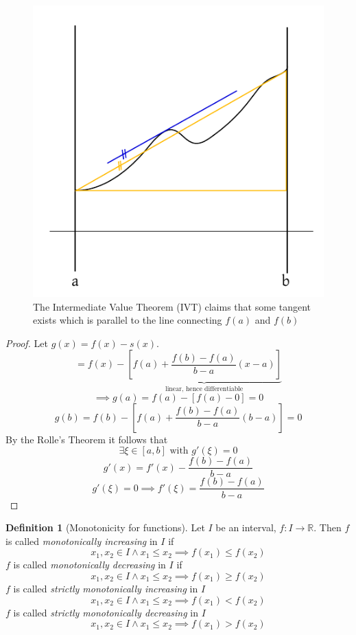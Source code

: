 \documentclass[a4paper,landscape,twocolumn]{article}
\theoremstyle{definition}
\newtheorem{defi}{Definition}
\begin{document}
\begin{figure}[!h]
  \begin{center}
    \includegraphics{img/intermediate_value_theorem.pdf}
    \caption{The Intermediate Value Theorem (IVT) claims that some tangent exists which is parallel to the line connecting $f(a)$ and $f(b)$}
  \end{center}
\end{figure}
%
\begin{proof}
  Let $g(x) = f(x) - s(x)$.
  \[ = f(x) - \underbrace{\left[f(a) + \frac{f(b) - f(a)}{b - a} (x - a)\right]}_{\text{linear, hence differentiable}} \]
  \[ \implies g(a) = f(a) - [f(a) - 0] = 0 \]
  \[ g(b) = f(b) - \left[f(a) + \frac{f(b) - f(a)}{b - a} (b - a)\right] = 0 \]
  By the Rolle's Theorem it follows that
  \[ \exists \xi \in [a,b] \text{ with } g'(\xi) = 0 \]
  \[ g'(x) = f'(x) - \frac{f(b) - f(a)}{b - a} \]
  \[ g'(\xi) = 0 \implies f'(\xi) = \frac{f(b) - f(a)}{b - a} \]
\end{proof}
%
\begin{defi}[Monotonicity for functions]
  Let $I$ be an interval, $f: I \to \mathbb R$. Then $f$ is called \emph{monotonically increasing} in $I$ if
  \[ x_1, x_2 \in I \land x_1 \leq x_2 \implies f(x_1) \leq f(x_2) \]
  $f$ is called \emph{monotonically decreasing} in $I$ if
  \[ x_1, x_2 \in I \land x_1 \leq x_2 \implies f(x_1) \geq f(x_2) \]
  $f$ is called \emph{strictly monotonically increasing} in $I$
  \[ x_1, x_2 \in I \land x_1 \leq x_2 \implies f(x_1) < f(x_2) \]
  $f$ is called \emph{strictly monotonically decreasing} in $I$
  \[ x_1, x_2 \in I \land x_1 \leq x_2 \implies f(x_1) > f(x_2) \]
\end{defi}
\end{document}
